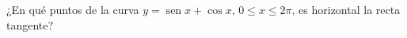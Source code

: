 \setcounter{enumi}{50}
\item ¿En qué puntos de la curva $y = \operatorname{sen} x + \cos x, \, 0 \le x \le 2\pi$, es horizontal la recta tangente?
